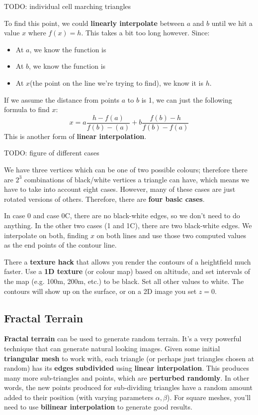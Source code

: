 \documentclass{article}
\begin{document}
TODO: individual cell marching triangles

To find this point, we could \textbf{linearly interpolate} between $a$ and $b$ until we hit a value $x$ where $f(x) = h$. This takes a bit too long however. Since:
\begin{itemize}
	\item At $a$, we know the function is
	\item At $b$, we know the function is
	\item At $x $(the point on the line we're trying to find), we know it is $h$.
\end{itemize}
If we assume the distance from points $a$ to $b$ is 1, we can just the following formula to find $x$:
\begin{equation}
	x = a \frac{h - f(a)}{f(b) - (a)} + b \frac{f(b) - h}{f(b) - f(a)}
	\label{eq:marching-triangles-interpolate}
\end{equation}
This is another form of \textbf{linear interpolation}.

TODO: figure of different cases

We have three vertices which can be one of two possible colours; therefore there are $2^3$ combinations of black/white vertices a triangle can have, which means we have to take into account eight cases. However, many of these cases are just rotated versions of others. Therefore, there are \textbf{four basic cases}.

In case 0 and case 0C, there are no black-white edges, so we don't need to do anything. In the other two cases (1 and 1C), there are two black-white edges. We interpolate on both, finding $x$ on both lines and use those two computed values as the end points of the contour line.

There a \textbf{texture hack} that allows you render the contours of a heightfield much faster. Use a \textbf{1D texture} (or colour map) based on altitude, and set intervals of the map (e.g. 100m, 200m, etc.) to be black. Set all other values to white. The contours will show up on the surface, or on a 2D image you set $z = 0$.

\subsection{Fractal Terrain}

\textbf{Fractal terrain} can be used to generate random terrain. It's a very powerful technique that can generate natural looking images. Given some initial \textbf{triangular mesh} to work with, each triangle (or perhaps just triangles chosen at random) has its \textbf{edges subdivided} using \textbf{linear interpolation}. This produces many more sub-triangles and points, which are \textbf{perturbed randomly}. In other words, the new points produced for sub-dividing triangles have a random amount added to their position (with varying parameters $\alpha,\beta$). For square meshes, you'll need to use \textbf{bilinear interpolation} to generate good results.
\end{document}

